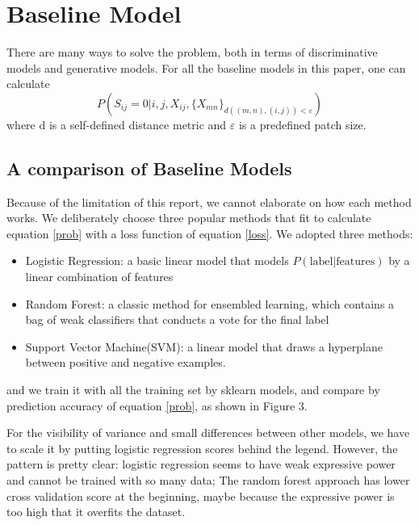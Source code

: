 \documentclass[conference]{IEEEtran}
\begin{document}
\section{Baseline Model}
There are many ways to solve the problem, both in terms of discriminative models and generative models. For all the baseline models in this paper, one can calculate 
\begin{equation}
\label{prob}
P(S_{ij} = 0 | i, j, X_{ij}, \{X_{mn}\}_{d((m,n), (i, j)) < \varepsilon})
\end{equation}
where d is a self-defined distance metric and $\varepsilon$ is a predefined patch size. 

\subsection{A comparison of Baseline Models}
Because of the limitation of this report, we cannot elaborate on how each method works. We deliberately choose three popular methods that fit to calculate equation \ref{prob} with a loss function of equation \ref{loss}. We adopted three methods:
\begin{itemize}
\item Logistic Regression: a basic linear model that models $P(\text{label|features})$ by a linear combination of features
\item Random Forest: a classic method for ensembled learning, which contains a bag of weak classifiers that conducts a vote for the final label
\item Support Vector Machine(SVM): a linear model that draws a hyperplane between positive and negative examples.
\end{itemize}
and we train it with all the training set by sklearn models, and compare by prediction accuracy of equation \ref{prob}, as shown in Figure 3. 

For the visibility of variance and small differences between other models, we have to scale it by putting logistic regression scores behind the legend. However, the pattern is pretty clear: logistic regression seems to have weak expressive power and cannot be trained with so many data; The random forest approach has lower cross validation score at the beginning, maybe because the expressive power is too high that it overfits the dataset. 
\end{document}
